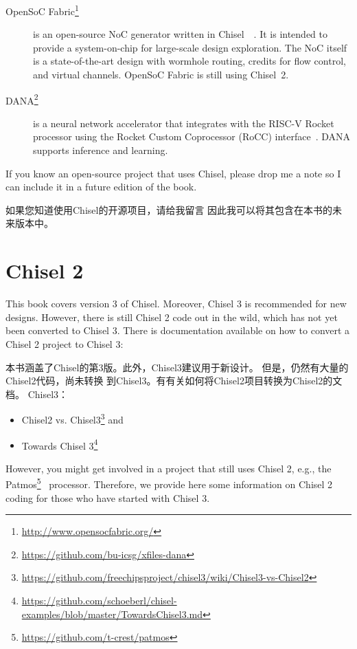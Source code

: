 \documentclass[%
    10pt,
    headinclude, footexclude,
    openright, %
    notitlepage,
    cleardoubleempty,
    headsepline,
    pointlessnumbers,
    bibtotoc, idxtotoc,
    ]{scrbook}
\newcommand{\myref}[2]{\href{#1}{#2}}
\renewcommand{\myref}[2]{{#2}{\footnote{\url{#1}}}}
\begin{document}
{\begin{description}
\item[\myref{http://www.opensocfabric.org/}{OpenSoC Fabric}] is an open-source NoC
generator written in Chisel~~\cite{OpenSoC:ispass2016}. It is intended to provide a
system-on-chip for large-scale design exploration. The NoC itself is a state-of-the-art design with wormhole routing, credits for flow control, and virtual channels.
OpenSoC Fabric is still using Chisel~2.

\item[\myref{https://github.com/bu-icsg/xfiles-dana}{DANA}] is a neural network accelerator
that integrates with the RISC-V Rocket processor using the Rocket Custom Coprocessor (RoCC) interface~\cite{RoCC:2015}.
DANA supports inference and learning.

\end{description}

If you know an open-source project that uses Chisel, please drop me a note
so I can include it in a future edition of the book.


如果您知道使用Chisel的开源项目，请给我留言
因此我可以将其包含在本书的未来版本中。

\chapter{Chisel 2}

This book covers version 3 of Chisel. Moreover, Chisel 3 is recommended for new designs.
However, there is still Chisel 2 code out in the wild, which has not yet been converted
to Chisel 3. There is documentation available on how to convert a Chisel 2 project to
Chisel 3:


本书涵盖了Chisel的第3版。此外，Chisel3建议用于新设计。
但是，仍然有大量的Chisel2代码，尚未转换
到Chisel3。有有关如何将Chisel2项目转换为Chisel2的文档。
Chisel3：

\begin{itemize}
\item \myref{https://github.com/freechipsproject/chisel3/wiki/Chisel3-vs-Chisel2}{Chisel2 vs. Chisel3} and
\item \myref{https://github.com/schoeberl/chisel-examples/blob/master/TowardsChisel3.md}{Towards Chisel 3}
\end{itemize}

However, you might get involved in a project that still uses Chisel 2,
e.g., the \myref{https://github.com/t-crest/patmos}{Patmos}~\cite{patmos:rts2018} processor.
Therefore, we provide here some information on Chisel 2 coding for those who
have started with Chisel 3.

}
\end{document}
